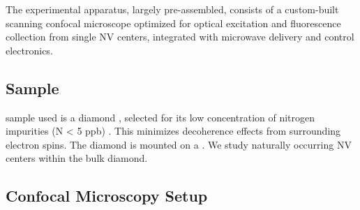 \documentclass[aps,prb,twocolumn,superscriptaddress,floatfix,longbibliography,citeautoscript]{revtex4-2}
\begin{document}
The experimental apparatus, largely pre-assembled, consists of a custom-built scanning confocal microscope optimized for optical excitation and fluorescence collection from single NV centers, integrated with microwave delivery and control electronics. \n\n\subsection{\label{sec:sample}Sample}\nThe sample used is a  diamond 
, selected for its low concentration of nitrogen impurities (N < 5 ppb) \cite{NV_description}. This minimizes decoherence effects from surrounding electron spins. The diamond is mounted on a . We study naturally occurring NV centers within the bulk diamond. \n\n\subsection{\label{sec:confocal}Confocal Microscopy Setup}
\end{document}

